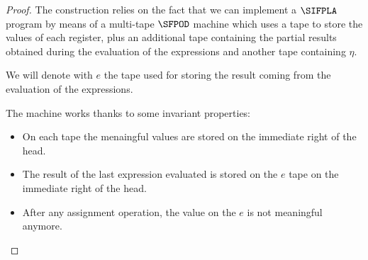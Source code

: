 \begin{proof}
%
The construction relies on the fact that we can implement a $\SIFPLA$ program
by means of a multi-tape $\SFPOD$ machine which uses a tape to store the values
of each register, plus an additional tape containing the partial results
obtained during the evaluation of the expressions
and another tape containing $\eta$.

We will denote with $e$ the tape used for storing the result coming from
the evaluation of the expressions.

The machine works thanks to some invariant properties:

\begin{itemize}
\item On each tape the menaingful values are stored on the immediate right of the head.
\item The result of the last expression evaluated is stored on the $e$ tape on the immediate right of the head.
\item After any assignment operation, the value on the $e$ is not meaningful anymore.
\end{itemize}



\end{proof}

